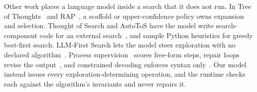 Other work places a language model inside a search that it does not run. In Tree of Thoughts~\citep{yao2023tree} and RAP~\citep{hao2023reasoning}, a scaffold or upper-confidence policy owns expansion and selection. Thought of Search and AutoToS have the model write search-component code for an external search~\citep{katz2024thought,cao2024automating}, and \citet{correa2025classical} sample Python heuristics for greedy best-first search. LLM-First Search lets the model steer exploration with no declared algorithm~\citep{herr2025llmfirst}. Process supervision~\citep{lightman2023lets} scores free-form steps, repair loops revise the output~\citep{kambhampati2024llms,madaan2023selfrefine}, and constrained decoding enforces syntax only~\citep{scholak2021picard,willard2023efficient}. Our model instead issues every exploration-determining operation, and the runtime checks each against the algorithm's invariants and never repairs it.

